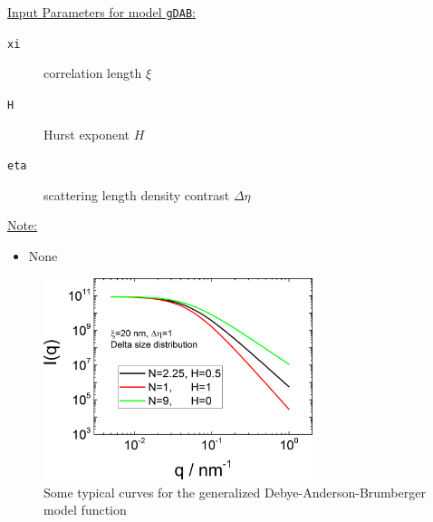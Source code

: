 \underline{Input Parameters for model \texttt{gDAB}:}\\
\begin{description}
\item[\texttt{xi}] correlation length $\xi$
\item[\texttt{H}] Hurst exponent $H$
\item[\texttt{eta}] scattering length density contrast $\Delta\eta$
\end{description}

\underline{Note:}
\begin{itemize}
\item None
\end{itemize}


\begin{figure}[htb]
\begin{center}
\includegraphics[width=0.7\textwidth]{../images/form_factor/nonparticular/gDAB.png}
\end{center}
\caption{Some typical curves for the generalized Debye-Anderson-Brumberger model function} \label{fig:gDABIq}
\end{figure}


\clearpage
